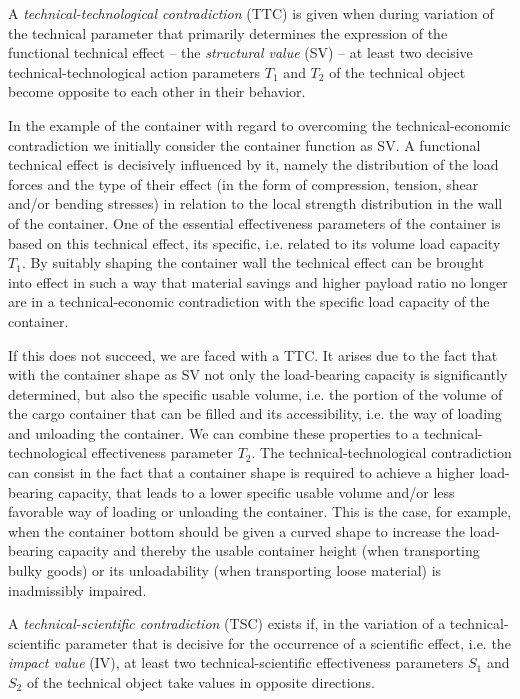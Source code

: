 \documentclass[11pt,a4paper]{article}
\begin{document}
A \emph{technical-technological contradiction} (TTC) is given when during
variation of the technical parameter that primarily determines the expression
of the functional technical effect -- the \emph{structural value} (SV) -- at
least two decisive technical-technological action parameters $T_1$ and $T_2$
of the technical object become opposite to each other in their behavior.

In the example of the container with regard to overcoming the
technical-economic contradiction we initially consider the container function
as SV.  A functional technical effect is decisively influenced by it, namely
the distribution of the load forces and the type of their effect (in the form
of compression, tension, shear and/or bending stresses) in relation to the
local strength distribution in the wall of the container. One of the essential
effectiveness parameters of the container is based on this technical effect,
its specific, i.e. related to its volume load capacity $T_1$. By suitably
shaping the container wall the technical effect can be brought into effect in
such a way that material savings and higher payload ratio no longer are in a
technical-economic contradiction with the specific load capacity of the
container.

If this does not succeed, we are faced with a TTC.  It arises due to the fact
that with the container shape as SV not only the load-bearing capacity is
significantly determined, but also the specific usable volume, i.e.  the
portion of the volume of the cargo container that can be filled and its
accessibility, i.e. the way of loading and unloading the container. We can
combine these properties to a technical-technological effectiveness parameter
$T_2$. The technical-technological contradiction can consist in the fact that
a container shape is required to achieve a higher load-bearing capacity, that
leads to a lower specific usable volume and/or less favorable way of loading
or unloading the container. This is the case, for example, when the container
bottom should be given a curved shape to increase the load-bearing capacity
and thereby the usable container height (when transporting bulky goods) or its
unloadability (when transporting loose material) is inadmissibly impaired.

A \emph{technical-scientific contradiction} (TSC) exists if, in the variation
of a technical-scientific parameter that is decisive for the occurrence of a
scientific effect, i.e. the \emph{impact value} (IV), at least two
technical-scientific effectiveness parameters $S_1$ and $S_2$ of the technical
object take values in opposite directions.
\end{document}
